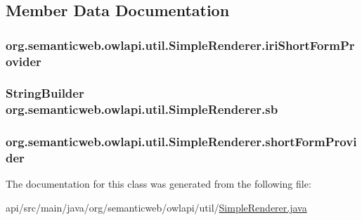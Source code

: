 \subsection{Member Data Documentation}
\hypertarget{classorg_1_1semanticweb_1_1owlapi_1_1util_1_1_simple_renderer_af10891aed7d2b0ec9bdec763fa5d085b}{
\subsubsection[{iri\-Short\-Form\-Provider}]{ org.\-semanticweb.\-owlapi.\-util.\-Simple\-Renderer.\-iri\-Short\-Form\-Provider\hspace{0.3cm}{\ttfamily [private]}}}\label{classorg_1_1semanticweb_1_1owlapi_1_1util_1_1_simple_renderer_af10891aed7d2b0ec9bdec763fa5d085b}
\hypertarget{classorg_1_1semanticweb_1_1owlapi_1_1util_1_1_simple_renderer_ad46f24b1c7ecf72eca8ddd51ab844772}{
\subsubsection[{sb}]{\setlength{\rightskip}{0pt plus 5cm}String\-Builder org.\-semanticweb.\-owlapi.\-util.\-Simple\-Renderer.\-sb\hspace{0.3cm}{\ttfamily [private]}}}\label{classorg_1_1semanticweb_1_1owlapi_1_1util_1_1_simple_renderer_ad46f24b1c7ecf72eca8ddd51ab844772}
\hypertarget{classorg_1_1semanticweb_1_1owlapi_1_1util_1_1_simple_renderer_aa6659dde9557d7c74c561823ac7db982}{
\subsubsection[{short\-Form\-Provider}]{ org.\-semanticweb.\-owlapi.\-util.\-Simple\-Renderer.\-short\-Form\-Provider\hspace{0.3cm}{\ttfamily [private]}}}\label{classorg_1_1semanticweb_1_1owlapi_1_1util_1_1_simple_renderer_aa6659dde9557d7c74c561823ac7db982}


The documentation for this class was generated from the following file\-:\begin{DoxyCompactItemize}
\item 
api/src/main/java/org/semanticweb/owlapi/util/\hyperlink{_simple_renderer_8java}{Simple\-Renderer.\-java}\end{DoxyCompactItemize}
